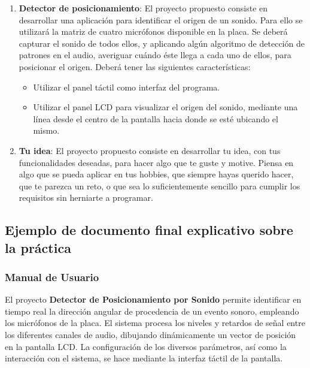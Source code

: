 \documentclass[../main.tex]{subfiles}
\begin{document}
\begin{enumerate}
            \item \textbf{Detector de posicionamiento}: El proyecto propuesto consiste en desarrollar una aplicación para identificar el origen de un sonido. Para ello se utilizará la matriz de cuatro micrófonos disponible en la placa. Se deberá capturar el sonido de todos ellos, y aplicando algún algoritmo de detección de patrones en el audio, averiguar cuándo éste llega a cada uno de ellos, para posicionar el origen. Deberá tener las siguientes características:
            
                \begin{itemize}
                    \item Utilizar el panel táctil como interfaz del programa.
                    \item Utilizar el panel LCD para visualizar el origen del sonido, mediante una línea desde el centro de la pantalla hacia donde se esté ubicando el mismo.
                \end{itemize}

            \item \textbf{Tu idea}: El proyecto propuesto consiste en desarrollar tu idea, con tus funcionalidades deseadas, para hacer algo que te guste y motive. Piensa en algo que se pueda aplicar en tus hobbies, que siempre hayas querido hacer, que te parezca un reto, o que sea lo suficientemente sencillo para cumplir los requisitos sin herniarte a programar.
            
        \end{enumerate}

            
    \newpage
    \subsection{Ejemplo de documento final explicativo sobre la práctica}\label{sub:project}

        \subsubsection{Manual de Usuario}

            El proyecto \textbf{Detector de Posicionamiento por Sonido} permite identificar en tiempo real la dirección angular de procedencia de un evento sonoro, empleando los micrófonos de la placa. El sistema procesa los niveles y retardos de señal entre los diferentes canales de audio, dibujando dinámicamente un vector de posición en la pantalla LCD. La configuración de los diversos parámetros, así como la interacción con el sistema, se hace mediante la interfaz táctil de la pantalla.
\end{document}
